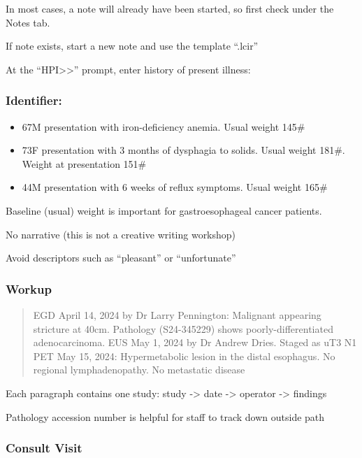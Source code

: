 \documentclass[
  letterpaper,
]{scrbook}
\providecommand{\tightlist}{%
  \setlength{\itemsep}{0pt}\setlength{\parskip}{0pt}}
\begin{document}
In most cases, a note will already have been started, so first check
under the Notes tab.

If note exists, start a new note and use the template ``.lcir''

At the ``HPI\textgreater\textgreater{}'' prompt, enter history of
present illness:

\subsubsection{Identifier:}\label{identifier}

\begin{itemize}
\tightlist
\item
  67M presentation with iron-deficiency anemia. Usual weight 145\#
\item
  73F presentation with 3 months of dysphagia to solids. Usual weight
  181\#. Weight at presentation 151\#
\item
  44M presentation with 6 weeks of reflux symptoms. Usual weight 165\#
\end{itemize}

Baseline (usual) weight is important for gastroesophageal cancer
patients.

No narrative (this is not a creative writing workshop)

Avoid descriptors such as ``pleasant'' or ``unfortunate''

\subsubsection{Workup}\label{workup}

\begin{quote}
EGD April 14, 2024 by Dr Larry Pennington: Malignant appearing stricture
at 40cm. Pathology (S24-345229) shows poorly-differentiated
adenocarcinoma. EUS May 1, 2024 by Dr Andrew Dries. Staged as uT3 N1 PET
May 15, 2024: Hypermetabolic lesion in the distal esophagus. No regional
lymphadenopathy. No metastatic disease
\end{quote}

Each paragraph contains one study: study -\textgreater{} date
-\textgreater{} operator -\textgreater{} findings

Pathology accession number is helpful for staff to track down outside
path

\subsubsection{Consult Visit}\label{consult-visit}
\end{document}
